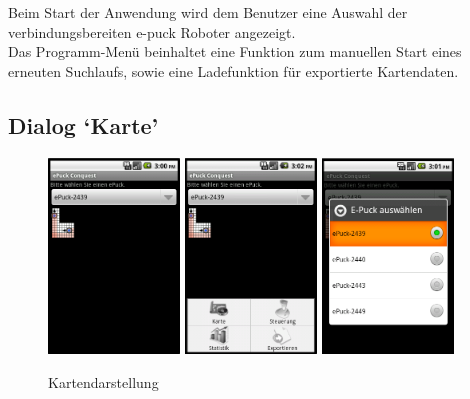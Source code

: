 \documentclass[10pt,a4paper]{article}
\begin{document}
  				Beim Start der Anwendung wird dem Benutzer eine Auswahl der verbindungsbereiten e-puck Roboter angezeigt.  \\
  				Das Programm-Menü beinhaltet eine Funktion zum manuellen Start eines erneuten Suchlaufs, sowie eine Ladefunktion
  				für exportierte Kartendaten.
			
			\subsection{Dialog `Karte'}

			\begin{figure}[h]
				  \centering
				\includegraphics[width=3.5cm]{screenshots_neu/map.png}
				\includegraphics[width=3.5cm]{screenshots_neu/map_menu.png}
				\includegraphics[width=3.5cm]{screenshots_neu/map_auswahl.png}
  				\caption{Kartendarstellung}
  			\end{figure}						
			
\end{document}
